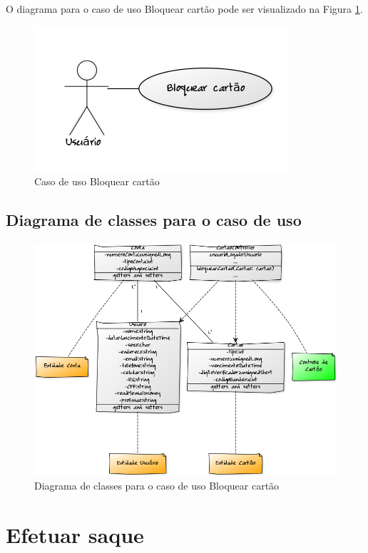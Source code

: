 O diagrama para o caso de uso Bloquear cartão pode ser visualizado na Figura \ref{cdu:bloquearCartao}.

\begin{figure}[!htb]
     \centering
     \includegraphics[scale=0.6]{diagramas/caso-de-uso/imagens/bloquearCartao.png}
     \caption{Caso de uso Bloquear cartão}
     \label{cdu:bloquearCartao}
\end{figure}

\subsection{Diagrama de classes para o caso de uso}

\begin{figure}[!htb]
     \centering
     \includegraphics[scale=0.5]{diagramas/diagrama-de-classe/imagens/bloquearCartao.png}
     \caption{Diagrama de classes para o caso de uso Bloquear cartão}
\end{figure}

\section{Efetuar saque}

